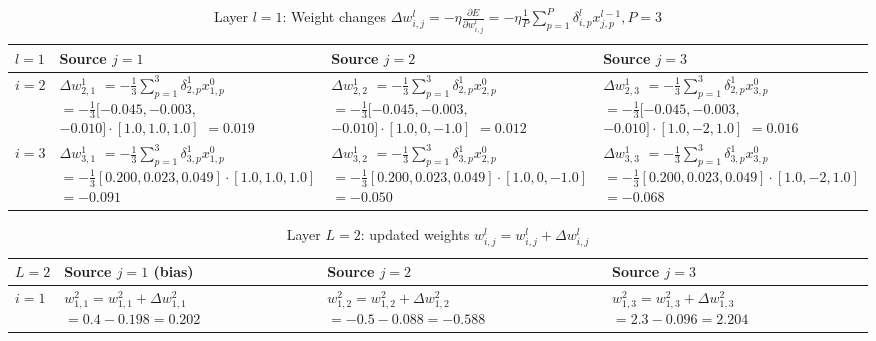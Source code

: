 \begin{table}[h!]
    \centering
    \begin{tabular}{|m{1.25cm}|p{4cm}|p{4cm}|p{4cm}|}
        \hline
        \centering $l = 1$ &
        Source $j = 1$ &
        Source $j = 2$ &
        Source $j = 3$ \\

        \hline
        \centering $i = 2$ &

        $\Delta w_{2, 1}^1$
        $= - \frac{1}{3} \sum_{p=1}^3{ \delta_{2, p}^1 x_{1, p}^0 }$
        $= - \frac{1}{3} [-0.045, -0.003,$
        $-0.010] \cdot [1.0, 1.0, 1.0]$
        $= 0.019$ &

        $\Delta w_{2, 2}^1$
        $= - \frac{1}{3} \sum_{p=1}^3{ \delta_{2, p}^1 x_{2, p}^0 }$
        $= - \frac{1}{3} [-0.045, -0.003,$
        $-0.010] \cdot [1.0, 0, -1.0]$
        $= 0.012$ &

        $\Delta w_{2, 3}^1$
        $= - \frac{1}{3} \sum_{p=1}^3{ \delta_{2, p}^1 x_{3, p}^0 }$
        $= - \frac{1}{3} [-0.045, -0.003,$
        $-0.010] \cdot [1.0, -2, 1.0]$
        $= 0.016$ \\

        \hline
        \centering $i = 3$ &

        $\Delta w_{3, 1}^1$
        $= - \frac{1}{3} \sum_{p=1}^3{ \delta_{3, p}^1 x_{1, p}^0 }$
        $= - \frac{1}{3} [0.200, 0.023, 0.049] \cdot [1.0, 1.0, 1.0]$
        $= -0.091$ &

        $\Delta w_{3, 2}^1$
        $= - \frac{1}{3} \sum_{p=1}^3{ \delta_{3, p}^1 x_{2, p}^0 }$
        $= - \frac{1}{3} [0.200, 0.023, 0.049] \cdot [1.0, 0, -1.0]$
        $= -0.050$ &

        $\Delta w_{3, 3}^1$
        $= - \frac{1}{3} \sum_{p=1}^3{ \delta_{3, p}^1 x_{3, p}^0 }$
        $= - \frac{1}{3} [0.200, 0.023, 0.049] \cdot [1.0, -2, 1.0]$
        $= -0.068$ \\
        \hline
    \end{tabular}
\caption{Layer $l = 1$: Weight changes $\Delta w_{i, j}^l = - \eta \frac{\partial E}{\partial w_{i, j}^l} = - \eta \frac{1}{P} \sum_{p=1}^P{ \delta_{i, p}^l x_{j, p}^{l-1} }, P = 3$}
\label{table:layer1-weight-change}
\end{table}

\begin{table}[h!]
    \centering
    \begin{tabular}{|m{1.25cm}|p{4cm}|p{4cm}|p{4cm}|}
        \hline
        \centering $L = 2$ &
        \centering Source $j = 1$ (bias) &
        Source $j = 2$ &
        Source $j = 3$ \\
        \hline
        \centering $i = 1$ &
        $w_{1, 1}^2 = w_{1, 1}^2 + \Delta w_{1, 1}^2$
        $= 0.4 - 0.198 = 0.202$ &
        $w_{1, 2}^2 = w_{1, 2}^2 + \Delta w_{1, 2}^2$
        $= -0.5 - 0.088 = -0.588$ &
        $w_{1, 3}^2 = w_{1, 3}^2 + \Delta w_{1, 3}^2$
        $= 2.3 - 0.096 = 2.204$ \\
        \hline
    \end{tabular}
\caption{Layer $L = 2$: updated weights $w_{i, j}^l = w_{i, j}^l + \Delta w_{i, j}^l$}
\label{table:layer2-updated-weights}
\end{table}

